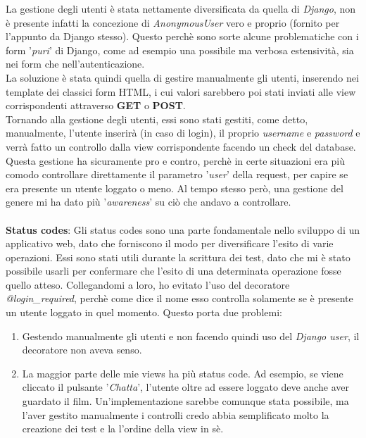 \documentclass[12pt]{article}
\begin{document}
	\noindent La gestione degli utenti è stata nettamente diversificata da quella di \textit{Django}, non è presente infatti la concezione di \textit{AnonymousUser} vero e proprio (fornito per l'appunto da Django stesso). Questo perchè sono sorte alcune problematiche con i form '\textit{puri}' di Django, come ad esempio una possibile ma verbosa estensività, sia nei form che nell'autenticazione.\\
	La soluzione è stata quindi quella di gestire manualmente gli utenti, inserendo nei template dei classici form HTML, i cui valori sarebbero poi stati inviati alle view corrispondenti attraverso \textbf{GET} o \textbf{POST}. \\
	Tornando alla gestione degli utenti, essi sono stati gestiti, come detto, manualmente, l'utente inserirà (in caso di login), il proprio \textit{username} e \textit{password} e verrà fatto un controllo dalla view corrispondente facendo un check del database. Questa gestione ha sicuramente pro e contro, perchè in certe situazioni era più comodo controllare direttamente il parametro '\textit{user}' della request, per capire se era presente un utente loggato o meno. Al tempo stesso però, una gestione del genere mi ha dato più '\textit{awareness}' su ciò che andavo a controllare. \\ \\
	
	\noindent \textbf{Status codes}: Gli status codes sono una parte fondamentale nello sviluppo di un applicativo web, dato che forniscono il modo per diversificare l'esito di varie operazioni. Essi sono stati utili durante la scrittura dei test, dato che mi è stato possibile usarli per confermare che l'esito di una determinata operazione fosse quello atteso. Collegandomi a loro, ho evitato l'uso del decoratore \textit{@login\_required}, perchè come dice il nome esso controlla solamente se è presente un utente loggato in quel momento. Questo porta due problemi:
	\begin{enumerate}
		\item Gestendo manualmente gli utenti e non facendo quindi uso del \textit{Django user}, il decoratore non aveva senso.
		\item La maggior parte delle mie views ha più status code. Ad esempio, se viene cliccato il pulsante '\textit{Chatta}', l'utente oltre ad essere loggato deve anche aver guardato il film. Un'implementazione sarebbe comunque stata possibile, ma l'aver gestito manualmente i controlli credo abbia semplificato molto la creazione dei test e la l'ordine della view in sè. \\ \\
	\end{enumerate}
	
\end{document}
